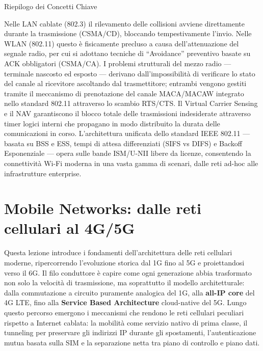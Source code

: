 \documentclass[
  italian,
  openany]{book}
\begin{document}
\begin{calloutnote}{Riepilogo dei Concetti Chiave}

Nelle LAN cablate (802.3) il rilevamento delle collisioni avviene
direttamente durante la trasmissione (CSMA/CD), bloccando
tempestivamente l'invio. Nelle WLAN (802.11) questo è fisicamente
precluso a causa dell'attenuazione del segnale radio, per cui si
adottano tecniche di ``Avoidance'' preventivo basate su ACK obbligatori
(CSMA/CA). I problemi strutturali del mezzo radio --- terminale nascosto
ed esposto --- derivano dall'impossibilità di verificare lo stato del
canale al ricevitore ascoltando dal trasmettitore; entrambi vengono
gestiti tramite il meccanismo di prenotazione del canale MACA/MACAW
integrato nello standard 802.11 attraverso lo scambio RTS/CTS. Il
Virtual Carrier Sensing e il NAV garantiscono il blocco totale delle
trasmissioni indesiderate attraverso timer logici interni che propagano
in modo distribuito la durata delle comunicazioni in corso.
L'architettura unificata dello standard IEEE 802.11 --- basata su BSS e
ESS, tempi di attesa differenziati (SIFS vs DIFS) e Backoff Esponenziale
--- opera sulle bande ISM/U-NII libere da licenze, consentendo la
connettività Wi-Fi moderna in una vasta gamma di scenari, dalle reti
ad-hoc alle infrastrutture enterprise.

\end{calloutnote}

\newpage

\chapter{Mobile Networks: dalle reti cellulari al
4G/5G}\label{mobile-networks-dalle-reti-cellulari-al-4g5g}

Questa lezione introduce i fondamenti dell'architettura delle reti
cellulari moderne, ripercorrendo l'evoluzione storica dal 1G fino al 5G
e proiettandosi verso il 6G. Il filo conduttore è capire come ogni
generazione abbia trasformato non solo la velocità di trasmissione, ma
soprattutto il modello architetturale: dalla commutazione a circuito
puramente analogica del 1G, alla \textbf{all-IP core} del 4G LTE, fino
alla \textbf{Service Based Architecture} cloud-native del 5G. Lungo
questo percorso emergono i meccanismi che rendono le reti cellulari
peculiari rispetto a Internet cablata: la mobilità come servizio nativo
di prima classe, il tunneling per preservare gli indirizzi IP durante
gli spostamenti, l'autenticazione mutua basata sulla SIM e la
separazione netta tra piano di controllo e piano dati.
\end{document}
